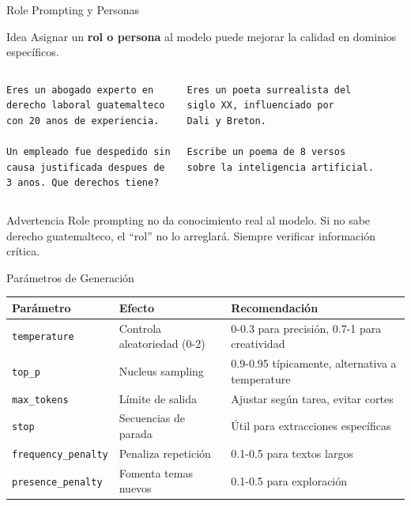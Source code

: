 \documentclass[aspectratio=169]{beamer}
\begin{document}
\begin{frame}[fragile]{Role Prompting y Personas}
    \begin{block}{Idea}
        Asignar un \textbf{rol o persona} al modelo puede mejorar la calidad en dominios específicos.
    \end{block}
    
    \begin{columns}
\begin{lstlisting}[style=promptstyle]
Eres un abogado experto en 
derecho laboral guatemalteco
con 20 anos de experiencia.

Un empleado fue despedido sin
causa justificada despues de
3 anos. Que derechos tiene?
\end{lstlisting}
        
\begin{lstlisting}[style=promptstyle]
Eres un poeta surrealista del
siglo XX, influenciado por 
Dali y Breton.

Escribe un poema de 8 versos
sobre la inteligencia artificial.
\end{lstlisting}
    \end{columns}
    
    \vspace{0.3cm}
    \begin{alertblock}{Advertencia}
        Role prompting no da conocimiento real al modelo. Si no sabe derecho guatemalteco, el ``rol'' no lo arreglará. Siempre verificar información crítica.
    \end{alertblock}
\end{frame}

\begin{frame}{Parámetros de Generación}
    \begin{table}[]
        \centering
        \renewcommand{\arraystretch}{1.3}
        \scriptsize
        \begin{tabular}{p{2.5cm} p{4cm} p{5.5cm}}
            \toprule
            \textbf{Parámetro} & \textbf{Efecto} & \textbf{Recomendación} \\
            \midrule
            \texttt{temperature} & Controla aleatoriedad (0-2) & 0-0.3 para precisión, 0.7-1 para creatividad \\
            \texttt{top\_p} & Nucleus sampling & 0.9-0.95 típicamente, alternativa a temperature \\
            \texttt{max\_tokens} & Límite de salida & Ajustar según tarea, evitar cortes \\
            \texttt{stop} & Secuencias de parada & Útil para extracciones específicas \\
            \texttt{frequency\_penalty} & Penaliza repetición & 0.1-0.5 para textos largos \\
            \texttt{presence\_penalty} & Fomenta temas nuevos & 0.1-0.5 para exploración \\
            \bottomrule
        \end{tabular}
    \end{table}

\end{frame}
\end{document}
